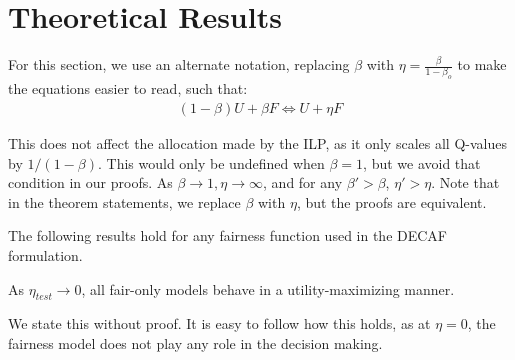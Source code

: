 
\section{Theoretical Results}
\label{sec:appendixTheoretical}

For this section, we use an alternate notation, replacing $\beta$ with $\eta= \frac{\beta}{1-\beta_o}$ to make the equations easier to read, such that:
\begin{align*}
    (1-\beta)U + \beta F \Leftrightarrow U + \eta F
\end{align*}

This does not affect the allocation made by the ILP, as it only scales all Q-values by $1/(1-\beta)$. This would only be undefined when $\beta=1$, but we avoid that condition in our proofs. As $\beta\rightarrow1, \eta\rightarrow\infty$, and for any $\beta'>\beta$, $\eta'>\eta$. Note that in the theorem statements, we replace $\beta$ with $\eta$, but the proofs are equivalent.

The following results hold for any fairness function used in the DECAF formulation.

\begin{proposition}
As $\eta_{test}\xrightarrow{} 0$, all fair-only models behave in a utility-maximizing manner.
\end{proposition}
We state this without proof. It is easy to follow how this holds, as at $\eta=0$, the fairness model does not play any role in the decision making.


